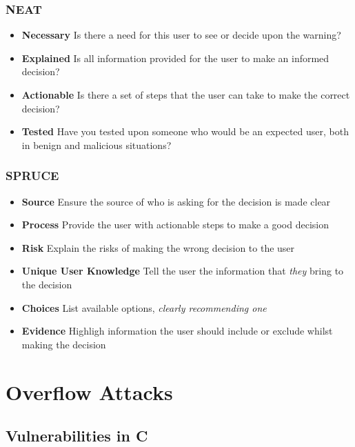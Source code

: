 \documentclass{article}
\begin{document}
\subsubsection{NEAT}

\begin{itemize}
\item \textbf{Necessary}
  \subitem
  Is there a need for this user to see or decide upon the warning?
\item \textbf{Explained}
  \subitem
  Is all information provided for the user to make an informed decision?
\item \textbf{Actionable}
  \subitem
  Is there a set of steps that the user can take to make the correct decision?
\item \textbf{Tested}
  \subitem
  Have you tested upon someone who would be an expected user, both in benign and malicious situations?
\end{itemize}

\filbreak
\subsubsection{SPRUCE}

\begin{itemize}
\item \textbf{Source}
  \subitem
  Ensure the source of who is asking for the decision is made clear
\item \textbf{Process}
  \subitem
  Provide the user with actionable steps to make a good decision
\item \textbf{Risk}
  \subitem
  Explain the risks of making the wrong decision to the user
\item \textbf{Unique User Knowledge}
  \subitem
  Tell the user the information that \textit{they} bring to the decision
\item \textbf{Choices}
  \subitem
  List available options, \textit{clearly recommending one}
\item \textbf{Evidence}
  \subitem
  Highligh information the user should include or exclude whilst making the decision
\end{itemize}

\section{Overflow Attacks}

\subsection{Vulnerabilities in C}
\end{document}
